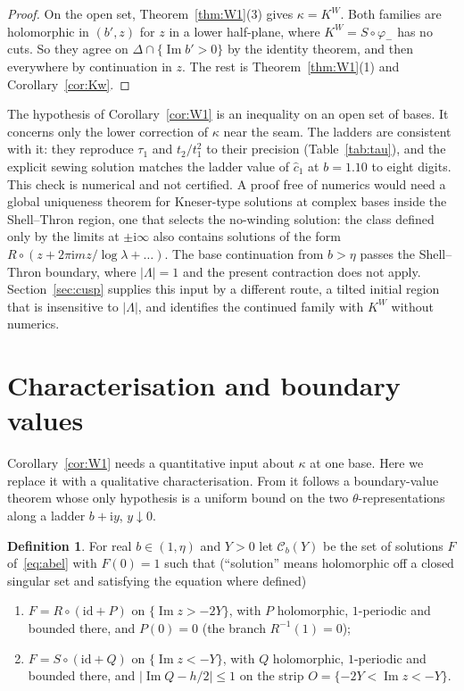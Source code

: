\documentclass[11pt]{amsart}
\theoremstyle{definition}
\newtheorem{definition}[theorem]{Definition}
\newcommand{\Rr}{R}
\newcommand{\Kk}{K}
\newcommand{\ii}{\mathrm{i}}
\begin{document}
\begin{proof}
On the open set, Theorem~\ref{thm:W1}(3) gives $\kappa=\Kk^W$.  Both families
are holomorphic in $(b',z)$ for $z$ in a lower half-plane, where $\Kk^W=S\circ\varphi_-$
has no cuts.  So they agree on $\Delta\cap\{\operatorname{Im}b'>0\}$ by the
identity theorem, and then everywhere by continuation in $z$.  The rest is Theorem~\ref{thm:W1}(1) and
Corollary~\ref{cor:Kw}.
\end{proof}

The hypothesis of Corollary~\ref{cor:W1} is an inequality on an open set of bases.  It
concerns only the lower correction of $\kappa$ near the seam.  The ladders
are consistent with it: they reproduce $\tau_1$ and $t_2/t_1^2$ to their
precision (Table~\ref{tab:tau}), and the explicit sewing solution matches the
ladder value of $\hat c_1$ at $b=1.10$ to eight digits.  This check is
numerical and not certified.  A proof free of numerics would need a global uniqueness theorem
for Kneser-type solutions at complex bases inside the Shell--Thron region,
one that selects the no-winding solution: the class defined only by the limits
at $\pm\ii\infty$ also contains solutions of the form
$\Rr\circ(z+2\pi\ii mz/\log\lambda+\ldots)$.  The base continuation from
$b>\eta$ passes the Shell--Thron boundary, where $|\Lambda|=1$ and the present
contraction does not apply.  Section~\ref{sec:cusp} supplies this input by a
different route, a tilted initial region that is insensitive to $|\Lambda|$, and
identifies the continued family with $\Kk^W$ without numerics.

\section{Characterisation and boundary values}\label{sec:char}

Corollary~\ref{cor:W1} needs a quantitative input about $\kappa$ at one base.
Here we replace it with a qualitative characterisation.  From it follows a
boundary-value theorem whose only hypothesis is a uniform bound on the two
$\theta$-representations along a ladder $b+\ii y$, $y\downarrow0$.

\begin{definition}\label{def:class}
For real $b\in(1,\eta)$ and $Y>0$ let $\mathcal C_b(Y)$ be the set of
solutions $F$ of~\eqref{eq:abel} with $F(0)=1$ such that
(``solution'' means holomorphic off a closed singular set and satisfying the
equation where defined)
\begin{enumerate}
\item[(a)] $F=\Rr\circ(\mathrm{id}+P)$ on $\{\operatorname{Im}z>-2Y\}$, with $P$
  holomorphic, $1$-periodic and bounded there, and $P(0)=0$ (the branch
  $\Rr^{-1}(1)=0$);
\item[(b)] $F=S\circ(\mathrm{id}+Q)$ on $\{\operatorname{Im}z<-Y\}$, with $Q$
  holomorphic, $1$-periodic and bounded there, and
  $|\operatorname{Im}Q-h/2|\le1$ on the strip $O=\{-2Y<\operatorname{Im}z<-Y\}$.
\end{enumerate}
\end{definition}
\end{document}
